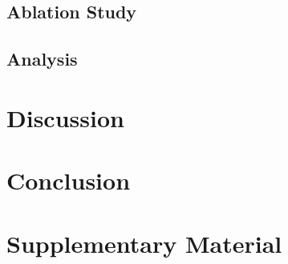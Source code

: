 \documentclass[12pt, a4paper]{article}
\begin{document}
\subsection{Ablation Study}


\subsection{Analysis}


\section{Discussion}
\label{sec:discussion}


\section{Conclusion}
\label{sec:conclusion}



\appendix

\section{Supplementary Material}
\label{app:supplementary}



\printbibliography

\end{document}
